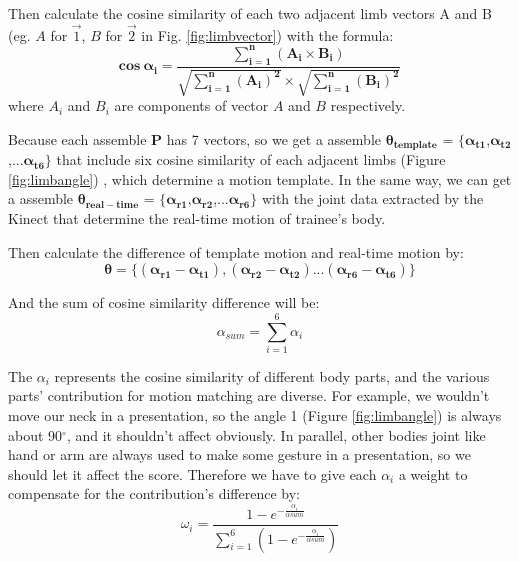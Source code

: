 \par Then calculate the cosine similarity of each two adjacent limb vectors A and B (eg. $A$ for $\vec 1$, $B$ for $\vec 2$ in Fig. \ref{fig:limbvector}) with the formula:
\begin{equation}
  \bm{cos} \ \bm{ \alpha_{i}} = \bm{\frac{\sum_{i =1}^{n}(A_{i}\times B_{i})}{\sqrt{\sum_{i=1}^{n}(A_{i})^{2}}\times \sqrt{\sum_{i=1}^{n}(B_{i})^{2}}}}
\label{cos}
\end{equation}
where $A_i$ and $B_i$ are components of vector $A$ and $B$ respectively.

\par Because each assemble $\bm{P}$ has 7 vectors, so we get a assemble $\bm{\theta_{template}}$ = $\lbrace\bm{\alpha_{t1}}$,$\bm{\alpha_{t2}}$,...$\bm{\alpha_{t6}}\rbrace$ that include six cosine similarity of each adjacent limbs (Figure \ref{fig:limbangle}) , which determine a motion template. In the same way, we can get a assemble $\bm{\theta_{real-time}}$ = $\lbrace\bm{\alpha_{r1}}$,$\bm{\alpha_{r2}}$,...$\bm{\alpha_{r6}}\rbrace$ with the joint data extracted by the Kinect that determine the real-time motion of trainee's body. 
\par Then calculate the difference of template motion and real-time motion by:
\begin{equation}
        \bm {\theta=\lbrace (\alpha_{r1}-\alpha_{t1}),(\alpha_{r2}-\alpha_{t2})...(\alpha_{r6}-\alpha_{t6})   \rbrace}
\label{difference}
\end{equation}
\par And the sum of cosine similarity difference will be:
\begin{equation}
\alpha _{sum} = \sum_{i=1}^{6}\alpha_{i}
\label{sum}
\end{equation}

\par The $\alpha_{i}$ represents the cosine similarity of different body parts, and the various parts' contribution for motion matching are diverse. For example, we wouldn't move our neck in a presentation, so the angle 1 (Figure \ref{fig:limbangle}) is always about 90$^\circ$, and it shouldn't affect obviously. In parallel, other bodies joint like hand or arm are always used to make some gesture in a presentation, so we should let it affect the score. Therefore we have to give each $\alpha_{i}$ a weight to compensate for the contribution's difference by:
\begin{equation}
  \omega_{i} = \frac{1-e^{-\frac{\alpha_{i}}{\alpha{sum}}}}{\sum_{i=1}^{6}(1-e^{-\frac{\alpha_{i}}{\alpha{sum}}})}    
\label{weight}
\end{equation}

